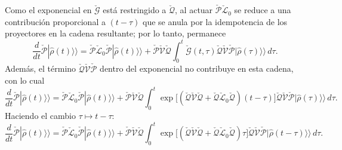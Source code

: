 \begin{appendixs}
Como el exponencial en $\check{\mathcal{G}}$ está restringido a $\check{\mathcal{Q}}$, al actuar
$\check{\mathcal{P}}\check{\mathcal{L}}_{0}$ se reduce a una contribución proporcional a $(t-\tau)$
que se anula por la idempotencia de los proyectores en la cadena resultante; por lo tanto,
permanece
\begin{equation*}
    \frac{d}{dt}\check{\mathcal{P}}|\hat{\rho}(t)\rangle\rangle
    =\check{\mathcal{P}}\check{\mathcal{L}}_{0}\check{\mathcal{P}}|\hat{\rho}(t)\rangle\rangle
     +\check{\mathcal{P}}\check{\mathcal{V}}\check{\mathcal{Q}}
      \int_{0}^{t}\!\check{\mathcal{G}}(t,\tau)\check{\mathcal{Q}}\check{\mathcal{V}}\check{\mathcal{P}}
      |\hat{\rho}(\tau)\rangle\rangle\,d\tau .
\end{equation*}
Además, el término $\check{\mathcal{Q}}\check{\mathcal{V}}\check{\mathcal{P}}$ dentro del
exponencial no contribuye en esta cadena, con lo cual
\begin{equation*}
    \frac{d}{dt}\check{\mathcal{P}}|\hat{\rho}(t)\rangle\rangle
    =\check{\mathcal{P}}\check{\mathcal{L}}_{0}\check{\mathcal{P}}|\hat{\rho}(t)\rangle\rangle
     +\check{\mathcal{P}}\check{\mathcal{V}}\check{\mathcal{Q}}
      \int_{0}^{t}\!\exp\!\Big[(\check{\mathcal{Q}}\check{\mathcal{V}}\check{\mathcal{Q}}
      +\check{\mathcal{Q}}\check{\mathcal{L}}_{0}\check{\mathcal{Q}})(t-\tau)\Big]
      \check{\mathcal{Q}}\check{\mathcal{V}}\check{\mathcal{P}}
      |\hat{\rho}(\tau)\rangle\rangle\,d\tau .
\end{equation*}
Haciendo el cambio $\tau\mapsto t-\tau$:
\begin{equation*}
    \frac{d}{dt}\check{\mathcal{P}}|\hat{\rho}(t)\rangle\rangle
    =\check{\mathcal{P}}\check{\mathcal{L}}_{0}\check{\mathcal{P}}|\hat{\rho}(t)\rangle\rangle
     +\check{\mathcal{P}}\check{\mathcal{V}}\check{\mathcal{Q}}
      \int_{0}^{t}\!\exp\!\Big[(\check{\mathcal{Q}}\check{\mathcal{V}}\check{\mathcal{Q}}
      +\check{\mathcal{Q}}\check{\mathcal{L}}_{0}\check{\mathcal{Q}})\tau\Big]
      \check{\mathcal{Q}}\check{\mathcal{V}}\check{\mathcal{P}}
      |\hat{\rho}(t-\tau)\rangle\rangle\,d\tau .
\end{equation*}



\end{appendixs}
